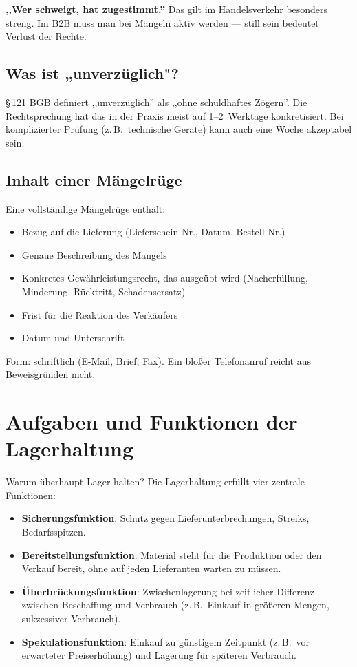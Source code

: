 \documentclass[11pt, a4paper]{article}
\begin{document}
\begin{eselsbruecke}
\textbf{,,Wer schweigt, hat zugestimmt.''} Das gilt im Handelsverkehr besonders streng.
Im B2B muss man bei Mängeln aktiv werden --- still sein bedeutet Verlust der Rechte.
\end{eselsbruecke}

\subsection{Was ist „unverzüglich"?}

§\,121 BGB definiert ,,unverzüglich'' als ,,ohne schuldhaftes Zögern''. Die Rechtsprechung
hat das in der Praxis meist auf 1--2~Werktage konkretisiert. Bei komplizierter Prüfung
(z.\,B.\ technische Geräte) kann auch eine Woche akzeptabel sein.

\subsection{Inhalt einer Mängelrüge}

Eine vollständige Mängelrüge enthält:

\begin{itemize}[itemsep=0pt]
  \item Bezug auf die Lieferung (Lieferschein-Nr., Datum, Bestell-Nr.)
  \item Genaue Beschreibung des Mangels
  \item Konkretes Gewähr\-leistungs\-recht, das ausgeübt wird (Nacherfüllung, Minderung, Rücktritt, Schadensersatz)
  \item Frist für die Reaktion des Verkäufers
  \item Datum und Unterschrift
\end{itemize}

Form: schriftlich (E-Mail, Brief, Fax). Ein bloßer Telefonanruf reicht aus
Beweisgründen nicht.

\section{Aufgaben und Funktionen der Lagerhaltung}

Warum überhaupt Lager halten? Die Lagerhaltung erfüllt vier zentrale Funktionen:

\begin{itemize}[itemsep=0pt]
  \item \textbf{Sicherungsfunktion}: Schutz gegen Lieferunterbrechungen, Streiks, Bedarfsspitzen.
  \item \textbf{Bereitstellungsfunktion}: Material steht für die Produktion oder den Verkauf bereit, ohne auf jeden Lieferanten warten zu müssen.
  \item \textbf{Überbrückungsfunktion}: Zwischenlagerung bei zeitlicher Differenz zwischen Beschaffung und Verbrauch (z.\,B.\ Einkauf in größeren Mengen, sukzessiver Verbrauch).
  \item \textbf{Spekulationsfunktion}: Einkauf zu günstigem Zeitpunkt (z.\,B.\ vor erwarteter Preiserhöhung) und Lagerung für späteren Verbrauch.
\end{itemize}
\end{document}
